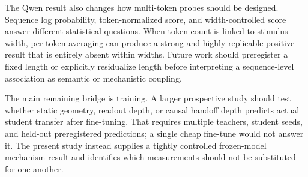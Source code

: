 The Qwen result also changes how multi-token probes should be designed. Sequence
log probability, token-normalized score, and width-controlled score answer
different statistical questions. When token count is linked to stimulus width,
per-token averaging can produce a strong and highly replicable positive result
that is entirely absent within widths. Future work should preregister a fixed
length or explicitly residualize length before interpreting a sequence-level
association as semantic or mechanistic coupling.

The main remaining bridge is training. A larger prospective study should test
whether static geometry, readout depth, or causal handoff depth predicts actual
student transfer after fine-tuning. That requires multiple teachers, student
seeds, and held-out preregistered predictions; a single cheap fine-tune would not
answer it. The present study instead supplies a tightly controlled frozen-model
mechanism result and identifies which measurements should not be substituted for
one another.
